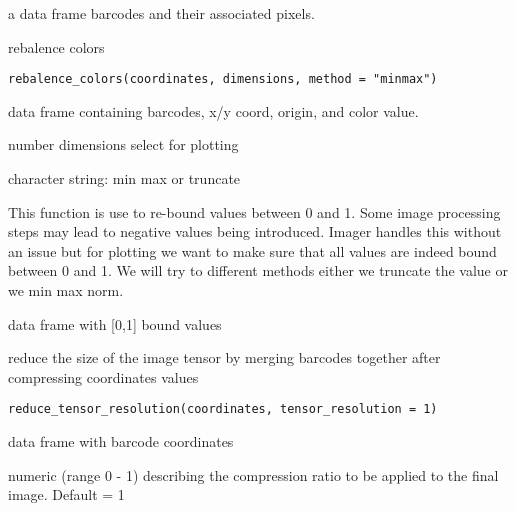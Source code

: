 \documentclass[a4paper]{book}
\begin{document}
%
\begin{Value}
a data frame barcodes and their associated pixels.
\end{Value}
%
\begin{Description}
rebalence colors
\end{Description}
%
\begin{Usage}
\begin{verbatim}
rebalence_colors(coordinates, dimensions, method = "minmax")
\end{verbatim}
\end{Usage}
%
\begin{Arguments}
\begin{ldescription}
\item[\code{coordinates}] data frame containing barcodes, x/y coord, origin,
and color value.

\item[\code{dimensions}] number dimensions select for plotting

\item[\code{method}] character string: min max or truncate
\end{ldescription}
\end{Arguments}
%
\begin{Details}
This function is use to re-bound values between 0 and 1. 
Some image processing steps may lead to negative values being introduced.
Imager handles this without an issue but for plotting we want to make sure 
that all values are indeed bound between 0 and 1. We will try to different 
methods either we truncate the value or we min max norm.
\end{Details}
%
\begin{Value}
data frame with [0,1] bound values
\end{Value}
%
\begin{Description}
reduce the size of the image tensor by merging barcodes together after
compressing coordinates values
\end{Description}
%
\begin{Usage}
\begin{verbatim}
reduce_tensor_resolution(coordinates, tensor_resolution = 1)
\end{verbatim}
\end{Usage}
%
\begin{Arguments}
\begin{ldescription}
\item[\code{coordinates}] data frame with barcode coordinates

\item[\code{tensor\_resolution}] numeric (range 0 - 1) describing the compression
ratio to be applied to the final image. Default = 1
\end{ldescription}
\end{Arguments}
\end{document}
